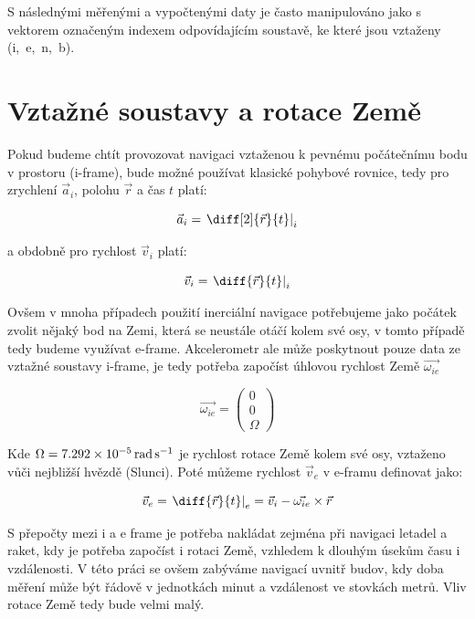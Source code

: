 S následnými měřenými a vypočtenými daty je často manipulováno jako s vektorem označeným indexem odpovídajícím soustavě, ke které jsou vztaženy (i,~e,~n,~b).

\section{Vztažné soustavy a rotace Země}
Pokud budeme chtít provozovat navigaci vztaženou k pevnému počátečnímu bodu v prostoru (i-frame), bude možné používat klasické pohybové rovnice, tedy pro zrychlení $ \vec{a}_{i} $, polohu $ \vec{r} $ a čas $ t $ platí: \cite{Tittertonc2004} 

\begin{equation} \label{eq:aiDiff}
\vec{a}_{i} = \left. \diff[2]{\vec{r}}{t} \right|_{i}
\end{equation}

a obdobně pro rychlost $ \vec{v}_{i} $ platí:

\begin{equation}
\vec{v}_{i} = \left. \diff{\vec{r}}{t} \right|_{i}
\end{equation}

Ovšem v mnoha případech použití inerciální navigace potřebujeme jako počátek zvolit nějaký bod na Zemi, která se neustále otáčí kolem své osy, v tomto případě tedy budeme využívat e-frame. Akcelerometr ale může poskytnout pouze data ze vztažné soustavy i-frame, je tedy potřeba započíst úhlovou rychlost Země $ \vec{\omega_{ie}} $ \cite{Tittertonc2004} 

\begin{equation}
\vec{\omega_{ie}} = \begin{pmatrix} 0 \\ 0 \\ \Omega \end{pmatrix}
\end{equation}

Kde $ \Omega = \SI{7,292E-5}{\radian\per\second}$ je rychlost rotace Země kolem své osy, vztaženo vůči nejbližší hvězdě (Slunci). Poté můžeme rychlost $ \vec{v}_{e} $ v e-framu definovat jako: \cite{Tittertonc2004} \cite{Grewal2013}

\begin{equation}
\vec{v}_{e} = \left. \diff{\vec{r}}{t} \right|_{e} = \vec{v}_{i} - \vec{\omega_{ie}} \times \vec{r}
\end{equation}

S přepočty mezi i a e frame je potřeba nakládat zejména při navigaci letadel a raket, kdy je potřeba započíst i rotaci Země, vzhledem k dlouhým úsekům času i vzdálenosti. V této práci se ovšem zabýváme navigací uvnitř budov, kdy doba měření může být řádově v jednotkách minut a vzdálenost ve stovkách metrů. Vliv rotace Země tedy bude velmi malý.

